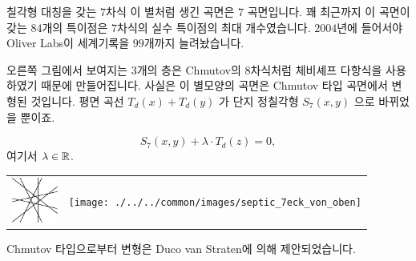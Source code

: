 \begin{surferPage}{칠각형 대칭을 갖는 $7$차식}
    이 별처럼 생긴 곡면은 $7$ 곡면입니다. 꽤 최근까지 이 곡면이 갖는 $84$개의 특이점은 $7$차식의 실수 특이점의 최대 개수였습니다. $2004$년에 들어서야 Oliver Labs이 세계기록을 $99$개까지 늘려놨습니다.
  
  
오른쪽 그림에서 보여지는 $3$개의 층은 Chmutov의 $8$차식처럼 체비셰프 다항식을 사용하였기 때문에 만들어집니다. 사실은 이 별모양의 곡면은 Chmutov 타입 곡면에서 변형된 것입니다. 평면 곡선 $T_d(x)+T_d(y)$ 가 단지 정칠각형 $S_7(x,y)$ 으로 바뀌었을 뿐이죠. 
   
   \[S_7(x,y) + \lambda \cdot T_d(z) = 0,\]
    여기서 $\lambda\in{\mathbb R}$. 
    \vspace*{-0.3em}
    \begin{center}
      \begin{tabular}{c@{\qquad}c}
        \includegraphics[height=1.5cm]{./../../common/images/labsseptic1.pdf}
        &
        \texttt{[image: ./../../common/images/septic\_7eck\_von\_oben]}
      \end{tabular}
    \end{center}
    \vspace*{-0.3em}   
Chmutov 타입으로부터 변형은 Duco van Straten에 의해 제안되었습니다.
\end{surferPage}
